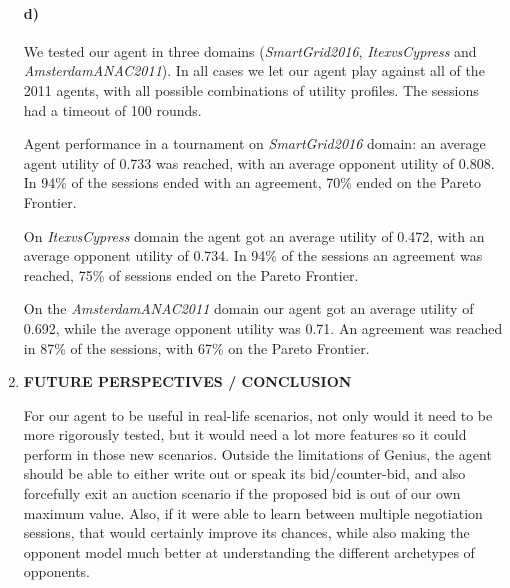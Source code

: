 \documentclass{article}
\begin{document}
\begin{enumerate}
\paragraph{d)}We tested our agent in three domains (\textit{SmartGrid2016}, \textit{ItexvsCypress} and \textit{AmsterdamANAC2011}). In all cases we let our agent play against all of the 2011 agents, with all possible combinations of utility profiles. The sessions had a timeout of 100 rounds.


Agent performance in a tournament on \textit{SmartGrid2016} domain: an average agent utility of 0.733 was reached, with an average opponent utility of 0.808. In 94\% of the sessions ended with an agreement, 70\% ended on the Pareto Frontier.

On \textit{ItexvsCypress} domain the agent got an average utility of 0.472, with  an average opponent utility of 0.734. In 94\% of the sessions an agreement was reached, 75\% of sessions ended on the Pareto Frontier. 

On the \textit{AmsterdamANAC2011} domain our agent got an average utility of 0.692, while the average opponent utility was 0.71. An agreement was reached in 87\% of the sessions, with 67\% on the Pareto Frontier.

\item \textbf{FUTURE PERSPECTIVES / CONCLUSION}

For our agent to be useful in real-life scenarios, not only would it need to be more rigorously tested, but it would need a lot more features so it could perform in those new scenarios. Outside the limitations of Genius, the agent should be able to either write out or speak its bid/counter-bid, and also forcefully exit an auction scenario if the proposed bid is out of our own maximum value. Also, if it were able to learn between multiple negotiation sessions, that would certainly improve its chances, while also making the opponent model much better at understanding the different archetypes of opponents.


\end{enumerate}
\end{document}
